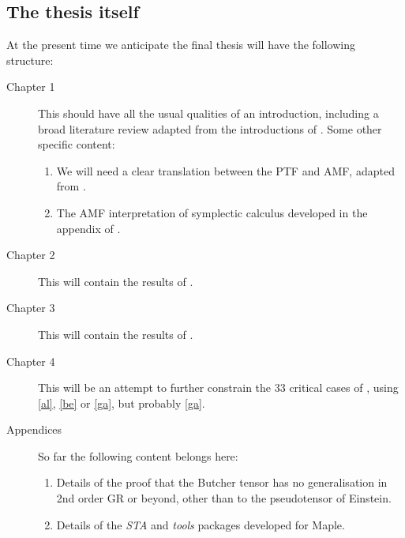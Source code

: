 \documentclass[twoside]{report}
\begin{document}
\begin{multicols}{2}
\subsection{The thesis itself}
At the present time we anticipate the final thesis will have the following structure:
\begin{description}
  \item[Chapter 1] This should have all the usual qualities of an introduction, including a broad literature review adapted from the introductions of \cite{2019JMP....60e2504B,paper-2}. Some other specific content: 
    \begin{enumerate}
      \item We will need a clear translation between the PTF and AMF, adapted from \cite{dictionary}.
      \item The AMF interpretation of symplectic calculus developed in the appendix of \cite{2019JMP....60e2504B}.
    \end{enumerate}
  \item[Chapter 2] This will contain the results of \cite{2019JMP....60e2504B}.
  \item[Chapter 3] This will contain the results of \cite{paper-2}.
  \item[Chapter 4\label{c4}] This will be an attempt to further constrain the 33 critical cases of \cite{2019PhRvD..99f4001L,Lin2}, using \ref{al}, \ref{be} or \ref{ga}, but probably \ref{ga}.
  \item[Appendices] So far the following content belongs here:
    \begin{enumerate}
      \item Details of the proof that the Butcher tensor \cite{2014JPhCS.484a2011B,2012PhRvD..86h4012B,2012PhRvD..86h4013B} has no generalisation in 2nd order GR or beyond, other than to the pseudotensor of Einstein.
      \item Details of the \textit{STA} and \textit{tools} packages developed for Maple.
    \end{enumerate}
\end{description}

\end{multicols}
\end{document}
